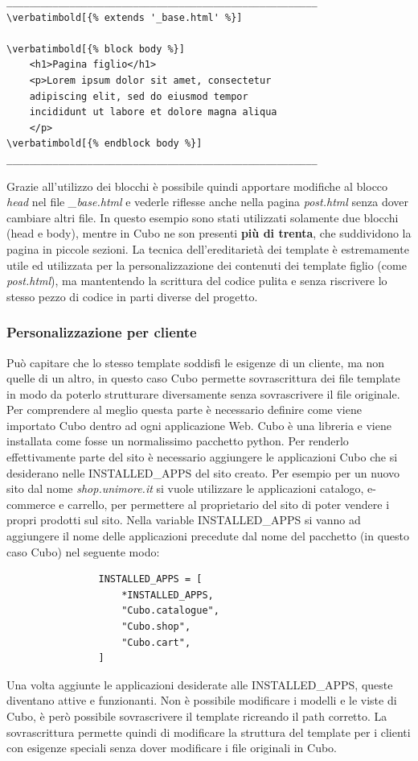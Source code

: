 \documentclass[12pt,a4paper]{article}
\newcommand\verbatimbold[1]{\textbf{#1}}
\begin{document}
\begin{Verbatim}[commandchars=\\\[\]]
______________________________________________________
\verbatimbold[{% extends '_base.html' %}]

\verbatimbold[{% block body %}]
    <h1>Pagina figlio</h1>
    <p>Lorem ipsum dolor sit amet, consectetur
    adipiscing elit, sed do eiusmod tempor
    incididunt ut labore et dolore magna aliqua
    </p>
\verbatimbold[{% endblock body %}]
______________________________________________________
\end{Verbatim}
Grazie all'utilizzo dei blocchi è possibile quindi apportare modifiche al blocco \textit{head} nel file \textit{\_base.html} e vederle riflesse anche nella pagina \textit{post.html} senza dover cambiare altri file.
In questo esempio sono stati utilizzati solamente due blocchi (head e body), mentre in Cubo ne son presenti \textbf{più di trenta}, che suddividono la pagina in piccole sezioni. La tecnica dell'ereditarietà dei template è estremamente utile ed utilizzata per la personalizzazione dei contenuti dei template figlio (come \textit{post.html}), ma mantentendo la scrittura del codice pulita e senza riscrivere lo stesso pezzo di codice in parti diverse del progetto.

\subsubsection{Personalizzazione per cliente}
Può capitare che lo stesso template soddisfi le esigenze di un cliente, ma non quelle di un altro, in questo caso Cubo permette sovrascrittura dei file template in modo da poterlo strutturare diversamente senza sovrascrivere il file originale. Per comprendere al meglio questa parte è necessario definire come viene importato Cubo dentro ad ogni applicazione Web.
Cubo è una libreria e viene installata come fosse un normalissimo pacchetto python. Per renderlo effettivamente parte del sito è necessario aggiungere le applicazioni Cubo che si desiderano nelle INSTALLED\_APPS del sito creato. Per esempio per un nuovo sito dal nome \textit{shop.unimore.it} si vuole utilizzare le applicazioni catalogo, e-commerce e carrello, per permettere al proprietario del sito di poter vendere i propri prodotti sul sito. Nella variable INSTALLED\_APPS si vanno ad aggiungere il nome delle applicazioni precedute dal nome del pacchetto (in questo caso Cubo) nel seguente modo:
\begin{Verbatim}
                INSTALLED_APPS = [
                    *INSTALLED_APPS,
                    "Cubo.catalogue",
                    "Cubo.shop",
                    "Cubo.cart",
                ]
\end{Verbatim}
Una volta aggiunte le applicazioni desiderate alle INSTALLED\_APPS, queste diventano attive e funzionanti. Non è possibile modificare i modelli e le viste di Cubo, è però possibile sovrascrivere il template ricreando il path corretto. La sovrascrittura permette quindi di modificare la struttura del template per i clienti con esigenze speciali senza dover modificare i file originali in Cubo.
\end{document}
